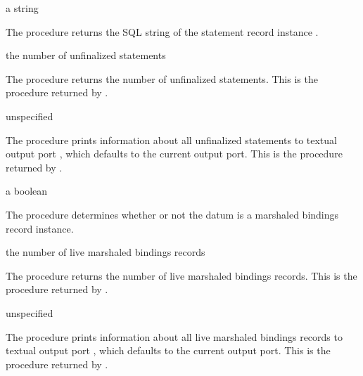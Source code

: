 \begin{procedure}
\end{procedure}
\returns{} a string

The  procedure returns the SQL string of the
statement record instance .

\begin{procedure}
\end{procedure}
\returns{} the number of unfinalized statements

The  procedure returns the number of unfinalized
statements.
This is the procedure returned by .

\begin{procedure}
\end{procedure}
\returns{} unspecified

The  procedure prints information about all
unfinalized statements to textual output port , which defaults
to the current output port.
This is the procedure returned by .

\begin{procedure}
\end{procedure}
\returns{} a boolean

The  procedure determines whether or not the datum
 is a marshaled bindings record instance.

\begin{procedure}
\end{procedure}
\returns{} the number of live marshaled bindings records

The  procedure returns the number of live marshaled
bindings records.
This is the procedure returned by .

\begin{procedure}
\end{procedure}
\returns{} unspecified

The  procedure prints information about all
live marshaled bindings records to textual output port , which
defaults to the current output port.
This is the procedure returned by .

